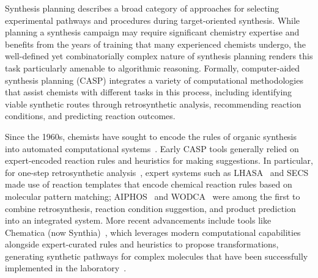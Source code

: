 \documentclass[pdflatex,sn-mathphys-num]{sn-jnl}%
\theoremstyle{thmstyleone}%
\theoremstyle{thmstyletwo}%
\theoremstyle{thmstylethree}%
\begin{document}

Synthesis planning describes a broad category of approaches for selecting experimental pathways and procedures during target-oriented synthesis.  While planning a synthesis campaign may require significant chemistry expertise and benefits from the years of training that many experienced chemists undergo, the well-defined yet combinatorially complex nature of synthesis planning renders this task particularly amenable to algorithmic reasoning. Formally, computer-aided synthesis planning (CASP) integrates a variety of computational methodologies that assist chemists with different tasks in this process, including identifying viable synthetic routes through retrosynthetic analysis, recommending reaction conditions, and predicting reaction outcomes.

Since the 1960s, chemists have sought to encode the rules of organic synthesis into automated computational systems~\citep{corey_computer-assisted_1969,warr_short_2014}. Early CASP tools generally relied on expert-encoded reaction rules and heuristics for making suggestions. In particular, for one-step retrosynthetic analysis~\citep{corey_robert_1988}, expert systems such as LHASA~\citep{corey_computer-assisted_1972} and SECS~\citep{wipke_simulation_1978} made use of reaction templates that encode chemical reaction rules based on molecular pattern matching; AIPHOS~\citep{funatsu_computer-assisted_1988} and WODCA~\citep{gasteiger_wodca_1990} were among the first to combine retrosynthesis, reaction condition suggestion, and product prediction into an integrated system. More recent advancements include tools like Chematica (now Synthia)~\citep{grzybowski_chematica_2018}, which leverages modern computational capabilities alongside expert-curated rules and heuristics to propose transformations, generating synthetic pathways for complex molecules that have been successfully implemented in the laboratory~\citep{klucznik_efficient_2018,mikulak-klucznik_computational_2020}. 

\end{document}
